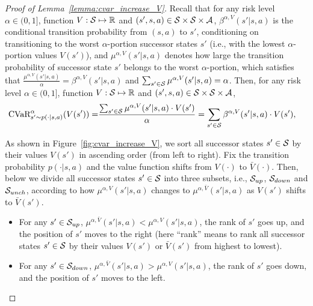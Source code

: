 \begin{proof}[Proof of Lemma~\ref{lemma:cvar_increase_V}]
	Recall that for any risk level $\alpha \in (0,1]$, function $V: \mathcal{S} \mapsto \mathbb{R}$ and $(s',s,a) \in \mathcal{S} \times \mathcal{S} \times \mathcal{A}$, $\beta^{\alpha,V}(s'|s,a)$ is the conditional transition probability from $(s,a)$ to $s'$, conditioning on transitioning to the worst $\alpha$-portion successor states $s'$ (i.e., with the lowest $\alpha$-portion values $V(s')$), and $\mu^{\alpha,V}(s'|s,a)$ denotes how large the transition probability of successor state $s'$ belongs to the worst $\alpha$-portion, which satisfies that  $\frac{\mu^{\alpha,V}(s'|s,a)}{\alpha} = \beta^{\alpha,V}(s'|s,a)$ and $\sum_{s' \in \mathcal{S}} \mu^{\alpha,V}(s'|s,a)=\alpha$.
	Then, for any risk level $\alpha \in (0,1]$, function $V: \mathcal{S} \mapsto \mathbb{R}$ and $(s',s,a) \in \mathcal{S} \times \mathcal{S} \times \mathcal{A}$,
	\begin{align*}
		\textup{CVaR}^{\alpha}_{s' \sim p(\cdot|s,a)}(V(s')) = & \frac{\sum_{s' \in \mathcal{S}} \mu^{\alpha,V}(s'|s,a) \cdot V(s')}{\alpha} = \sum_{s' \in \mathcal{S}} \beta^{\alpha,V}(s'|s,a) \cdot V(s') ,
	\end{align*}
	
	As shown in Figure~\ref{fig:cvar_increase_V}, we sort all successor states $s' \in \mathcal{S}$ by their values $V(s')$ in ascending order (from left to right).
	Fix the transition probability $p(\cdot|s,a)$ and the value function shifts from $V(\cdot)$ to $\bar{V}(\cdot)$. Then, below we divide all successor states $s' \in \mathcal{S}$ into three subsets, i.e., $\mathcal{S}_{up}$, $\mathcal{S}_{down}$ and $\mathcal{S}_{unch}$, according to how $\mu^{\alpha,V}(s'|s,a)$ changes to $\mu^{\alpha,\bar{V}}(s'|s,a)$ as $V(s')$ shifts to $\bar{V}(s')$.
	
	\begin{itemize}
		\item For any $s' \in \mathcal{S}_{up}$,  $\mu^{\alpha,\bar{V}}(s'|s,a) < \mu^{\alpha,V}(s'|s,a)$, the rank of $s'$ goes up, and the position of $s'$ moves to the right (here ``rank'' means to rank all successor states $s' \in \mathcal{S}$ by their values $V(s')$ or $\bar{V}(s')$ from highest to lowest). 
		
		\item For any $s' \in \mathcal{S}_{down}$,  $\mu^{\alpha,\bar{V}}(s'|s,a) > \mu^{\alpha,V}(s'|s,a)$, the rank of $s'$ goes down, and the position of $s'$ moves to the left. 
		

\end{itemize}
\end{proof}
